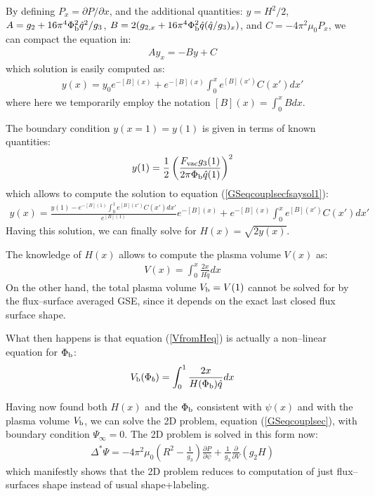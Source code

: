 By defining $P_x = \partial P / \partial x$, and the additional quantities: $y=H^2/2$, $A=g_2+16 \pi^4 \Phi_{\rm b}^2 \hat{q}^2/g_3$, $B=2(g_{2,x}+16 \pi^4 \Phi_{\rm b}^2 \hat{q}(\hat{q}/g_3)_x)$, and $C=-4\pi^2 \mu_0 P_x$, we can compact the equation in:
\begin{eqnarray}
A y_x = -B y + C
\label{GSeqcouplsecfsay}
\end{eqnarray}
which solution is easily computed as:
\begin{eqnarray}
y(x) =y_0 e^{-[B](x)} + e^{-[B](x)}\int_0^x{e^{[B](x')}C(x')dx'} 
\label{GSeqcouplsecfsaysol1}
\end{eqnarray}
where here we temporarily employ the notation $[B](x)=\int_0^x Bdx$.

The boundary condition $y(x=1)=y(1)$ is given in terms of known quantities:
\begin{eqnarray}
y(1) = \frac{1}{2}\left(\frac{F_{\rm vac} g_{3}(1)}{2\pi\Phi_{\rm b}\hat{q}(1)}\right)^2 
\label{y1bc}
\end{eqnarray}
which allows to compute the solution to equation (\ref{GSeqcouplsecfsaysol1}):
\begin{eqnarray}
y(x) =\frac{y(1)-e^{-[B](1)}\int_0^1{e^{[B](x')}C(x')dx'}}{e^{[B](1)}} e^{-[B](x)} + e^{-[B](x)}\int_0^x{e^{[B](x')}C(x')dx'} 
\label{GSeqcouplsecfsaysol2}
\end{eqnarray}
Having this solution, we can finally solve for $H(x)=\sqrt{2y(x)}$.

The knowledge of $H(x)$ allows to compute the plasma volume $V(x)$ as:
\begin{eqnarray}
V(x) =\int_0^x \frac{2x}{H\hat{q}}dx 
\label{VfromHeq}
\end{eqnarray}
On the other hand, the total plasma volume $V_{\rm b}=V(1)$ cannot be solved for by the flux--surface
averaged GSE, since it depends on the exact last closed flux surface shape. 

What then happens is that equation (\ref{VfromHeq}) is actually a non--linear equation for $\Phi_{\rm b}$:
\begin{eqnarray}
V_{\rm b}(\Phi_b) =\int_0^1 \frac{2x}{H(\Phi_{\rm b})\hat{q}}dx 
\label{VfromHeq}
\end{eqnarray}

Having now found both $H(x)$ and the $\Phi_{\rm b}$ consistent with $\psi(x)$ and with the plasma volume
$V_{\rm b}$, we can solve the 2D problem, equation (\ref{GSeqcouplsec}), with boundary condition
$\Psi_{\infty}=0$. The 2D problem is solved in this form now:
\begin{eqnarray}
\Delta^* \Psi = -4\pi^2 \mu_0 \left(R^2-\frac{1}{g_3}\right) \frac{\partial P}{\partial\psi} + \frac{1 }{g_3}  \frac{\partial }{\partial V} \left(g_2 H \right)
\label{GSeqcouplsecfinal}
\end{eqnarray}
which manifestly shows that the 2D problem reduces to computation of just flux--surfaces shape instead of usual
shape+labeling.

